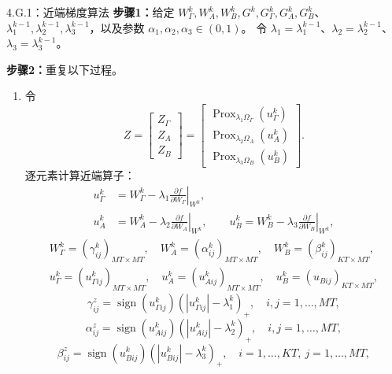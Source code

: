 \begin{bookalgorithm}{4.G.1：近端梯度算法}
\textbf{步骤1：}给定 $W_\Gamma^k,W_A^k,W_B^k,G^k,G_\Gamma^k,G_A^k,G_B^k$、
$\lambda_1^{k-1},\lambda_2^{k-1},\lambda_3^{k-1}$，以及参数 $\alpha_1,\alpha_2,\alpha_3\in(0,1)$。
令 $\lambda_1=\lambda_1^{k-1}$、$\lambda_2=\lambda_2^{k-1}$、$\lambda_3=\lambda_3^{k-1}$。

\textbf{步骤2：}重复以下过程。
\begin{enumerate}
\item 令
\[
Z=\begin{bmatrix}Z_\Gamma\\Z_A\\Z_B\end{bmatrix}
=\begin{bmatrix}
\operatorname{Prox}_{\lambda_1\Omega_\Gamma}(u_\Gamma^k)\\
\operatorname{Prox}_{\lambda_2\Omega_A}(u_A^k)\\
\operatorname{Prox}_{\lambda_3\Omega_B}(u_B^k)
\end{bmatrix}.
\]
逐元素计算近端算子：
\[
\begin{aligned}
u_\Gamma^k&=W_\Gamma^k-\lambda_1\left.\frac{\partial f}{\partial W_\Gamma}\right|_{W^k},\\
u_A^k&=W_A^k-\lambda_2\left.\frac{\partial f}{\partial W_A}\right|_{W^k},\qquad
u_B^k=W_B^k-\lambda_3\left.\frac{\partial f}{\partial W_B}\right|_{W^k},
\end{aligned}
\]
\[
\begin{gathered}
W_\Gamma^k=(\gamma_{ij}^k)_{MT\times MT},\quad
W_A^k=(\alpha_{ij}^k)_{MT\times MT},\quad W_B^k=(\beta_{ij}^k)_{KT\times MT},\\
u_\Gamma^k=(u_{\Gamma ij}^k)_{MT\times MT},\quad
u_A^k=(u_{Aij}^k)_{MT\times MT},\quad u_B^k=(u_{Bij})_{KT\times MT},
\end{gathered}
\]
\begin{equation}
\gamma_{ij}^z=\operatorname{sign}(u_{\Gamma ij}^k)(|u_{\Gamma ij}^k|-\lambda_1^k)_+,
\quad i,j=1,\ldots,MT,\tag{4.G.23}
\end{equation}
\begin{equation}
\alpha_{ij}^z=\operatorname{sign}(u_{Aij}^k)(|u_{Aij}^k|-\lambda_2^k)_+,
\quad i,j=1,\ldots,MT,\tag{4.G.24}
\end{equation}
\begin{equation}
\beta_{ij}^z=\operatorname{sign}(u_{Bij}^k)(|u_{Bij}^k|-\lambda_3^k)_+,
\quad i=1,\ldots,KT,\ j=1,\ldots,MT,\tag{4.G.25}
\end{equation}
\begin{equation}

\end{equation}
\end{enumerate}
\end{bookalgorithm}
